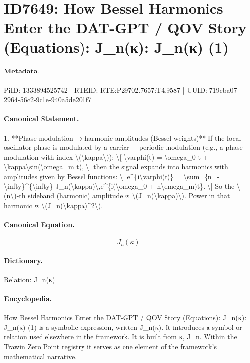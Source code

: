 \section*{ID7649: How Bessel Harmonics Enter the DAT-GPT / QOV Story (Equations): J\_n(κ): J\_n(κ) (1)}
\paragraph{Metadata.}
PiID: 1333894525742 | RTEID: RTE:P29702.7657:T4.9587 | UUID: 719cba07-2964-56c2-9c1e-940a5de201f7

\paragraph{Canonical Statement.}
1. **Phase modulation → harmonic amplitudes (Bessel weights)** If the local oscillator phase is modulated by a carrier + periodic modulation (e.g., a phase modulation with index \textbackslash{}(\textbackslash{}kappa\textbackslash{})): \textbackslash{}[ \textbackslash{}varphi(t) = \textbackslash{}omega\_0 t + \textbackslash{}kappa\textbackslash{}sin(\textbackslash{}omega\_m t), \textbackslash{}] then the signal expands into harmonics with amplitudes given by Bessel functions: \textbackslash{}[ e\textasciicircum{}\{i\textbackslash{}varphi(t)\} = \textbackslash{}sum\_\{n=-\textbackslash{}infty\}\textasciicircum{}\{\textbackslash{}infty\} J\_n(\textbackslash{}kappa)\textbackslash{},e\textasciicircum{}\{i(\textbackslash{}omega\_0 + n\textbackslash{}omega\_m)t\}. \textbackslash{}] So the \textbackslash{}(n\textbackslash{})-th sideband (harmonic) amplitude ∝ \textbackslash{}(J\_n(\textbackslash{}kappa)\textbackslash{}). Power in that harmonic ∝ \textbackslash{}(J\_n(\textbackslash{}kappa)\textasciicircum{}2\textbackslash{}).

\paragraph{Canonical Equation.}
\[
J_n(\kappa)
\]

\paragraph{Dictionary.}
Relation: J\_n(κ)

\paragraph{Encyclopedia.}
How Bessel Harmonics Enter the DAT-GPT / QOV Story (Equations): J\_n(κ): J\_n(κ) (1) is a symbolic expression, written J\_n(κ). It introduces a symbol or relation used elsewhere in the framework. It is built from κ, J\_n. Within the Trawin Zero Point registry it serves as one element of the framework's mathematical narrative.
